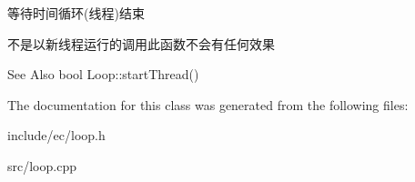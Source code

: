 等待时间循环(线程)结束 

不是以新线程运行的调用此函数不会有任何效果 \begin{DoxySeeAlso}{See Also}
bool Loop\-::start\-Thread() 
\end{DoxySeeAlso}


The documentation for this class was generated from the following files\-:\begin{DoxyCompactItemize}
\item 
include/ec/loop.\-h\item 
src/loop.\-cpp\end{DoxyCompactItemize}
